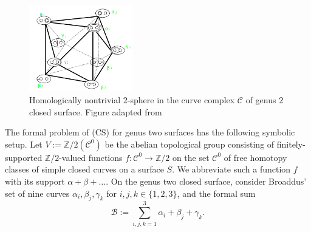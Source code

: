 \documentclass[12pt]{amsart}
\theoremstyle{definition}
\theoremstyle{remark}
\newcommand{\bZ}{\mathbb{Z}}
\newcommand{\sB}{\mathscr{B}}
\newcommand{\sC}{\mathscr{C}}
\begin{document}
\begin{figure}
\centering
\includegraphics[width=0.4\textwidth]{broaddus-sphere-marked-new.png}
\caption{Homologically nontrivial $2$-sphere in the curve complex $\sC$ of genus $2$ closed surface. Figure adapted from \cite[Fig.10]{Broaddus2012}}\label{br}
\end{figure}



The formal problem of (CS) for genus two surfaces has the following symbolic setup. Let $V:=\bZ/2(\sC^0)$ be the abelian topological group consisting of finitely-supported $\bZ/2$-valued functions $f: \sC^0 \to \bZ/2$ on the set $\sC^0$ of free homotopy classes of simple closed curves on a surface $S$. We abbreviate such a function $f$ with its support $\alpha+\beta+\ldots$. On the genus two closed surface, consider Broaddus' set of nine curves $\alpha_i, \beta_j, \gamma_k$ for $i,j,k \in \{1,2,3\}$, and the formal sum 
\begin{equation}\label{bb}
\sB:= \sum_{i,j,k=1}^{3} \alpha_i+\beta_j+\gamma_k.
\end{equation}
\end{document}
